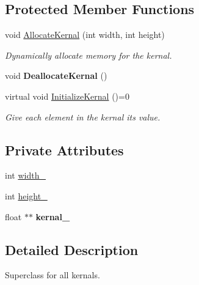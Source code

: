 \subsection*{Protected Member Functions}
\begin{DoxyCompactItemize}
\item 
void \hyperlink{classKernal_a235884b216e150becade52c23e71ecbd}{Allocate\+Kernal} (int width, int height)\hypertarget{classKernal_a235884b216e150becade52c23e71ecbd}{}\label{classKernal_a235884b216e150becade52c23e71ecbd}

\begin{DoxyCompactList}\small\item\em Dynamically allocate memory for the kernal. \end{DoxyCompactList}\item 
void {\bfseries Deallocate\+Kernal} ()\hypertarget{classKernal_a97aec0d6fc0401f0eb07af64a3a51bec}{}\label{classKernal_a97aec0d6fc0401f0eb07af64a3a51bec}

\item 
virtual void \hyperlink{classKernal_a487ef0e4a0d37cb827b5c46750330952}{Initialize\+Kernal} ()=0
\begin{DoxyCompactList}\small\item\em Give each element in the kernal it\textquotesingle{}s value. \end{DoxyCompactList}\end{DoxyCompactItemize}
\subsection*{Private Attributes}
\begin{DoxyCompactItemize}
\item 
int \hyperlink{classKernal_a7d5e5d7043f47581af9143d120554892}{width\+\_\+}
\item 
int \hyperlink{classKernal_a62db7ebf9b112db0e3fc971e571a2e2a}{height\+\_\+}
\item 
float $\ast$$\ast$ {\bfseries kernal\+\_\+}\hypertarget{classKernal_a391125232eed9c5fb6ac6c88541983ba}{}\label{classKernal_a391125232eed9c5fb6ac6c88541983ba}

\end{DoxyCompactItemize}


\subsection{Detailed Description}
Superclass for all kernals. 

